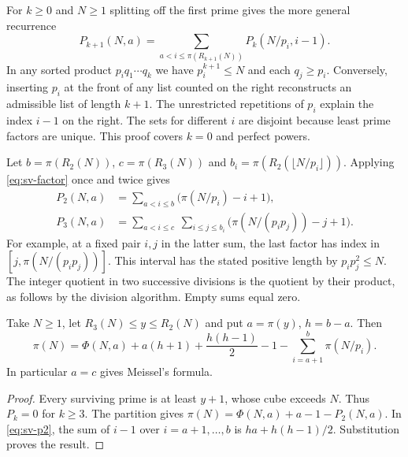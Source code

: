 For $k\ge0$ and $N\ge1$ splitting off the first prime gives the more general recurrence
\begin{equation}
 P_{k+1}(N,a)=\sum_{a<i\le \pi(R_{k+1}(N))}
       P_k(N/p_i,i-1).
 \label{eq:sv-factor}
\end{equation}
In any sorted product $p_i q_1\cdots q_k$ we have $p_i^{k+1}\le N$ and each $q_j\ge p_i$. Conversely, inserting $p_i$ at the front of any list counted on the right reconstructs an admissible list of length $k+1$. The unrestricted repetitions of $p_i$ explain the index $i-1$ on the right. The sets for different $i$ are disjoint because least prime factors are unique. This proof covers $k=0$ and perfect powers.

Let $b=\pi(R_2(N))$, $c=\pi(R_3(N))$ and $b_i=\pi(R_2(\lfloor N/p_i\rfloor))$. Applying \eqref{eq:sv-factor} once and twice gives
\begin{align}
 P_2(N,a)&=\sum_{a<i\le b}\big(\pi(N/p_i)-i+1\big),\label{eq:sv-p2}\\
 P_3(N,a)&=\sum_{a<i\le c}\ \sum_{i\le j\le b_i}
     \big(\pi(N/(p_i p_j))-j+1\big).\label{eq:sv-p3}
\end{align}
For example, at a fixed pair $i,j$ in the latter sum, the last factor has index in $[j,\pi(N/(p_i p_j))]$. This interval has the stated positive length by $p_ip_j^2\le N$. The integer quotient in two successive divisions is the quotient by their product, as follows by the division algorithm. Empty sums equal zero.

\begin{proposition}
Take $N\ge1$, let $R_3(N)\le y\le R_2(N)$ and put $a=\pi(y)$, $h=b-a$. Then
\[
 \pi(N)=\Phi(N,a)+a(h+1)+\frac{h(h-1)}2-1
               -\sum_{i=a+1}^b\pi(N/p_i).
\]
In particular $a=c$ gives Meissel's formula.
\end{proposition}
\begin{proof}
Every surviving prime is at least $y+1$, whose cube exceeds $N$. Thus $P_k=0$ for $k\ge3$. The partition gives $\pi(N)=\Phi(N,a)+a-1-P_2(N,a)$. In \eqref{eq:sv-p2}, the sum of $i-1$ over $i=a+1,\ldots,b$ is $ha+h(h-1)/2$. Substitution proves the result.
\end{proof}

